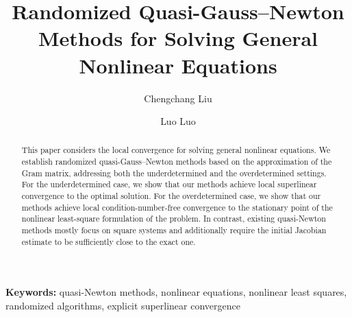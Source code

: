 \documentclass[11pt]{article}
\theoremstyle{plain}
\theoremstyle{definition}
\theoremstyle{remark}
\theoremstyle{plain}
\newenvironment{keywords}
  {\par\medskip\noindent\small\textbf{Keywords:} }
  {\par\medskip}
\begin{document}
\title{Randomized Quasi-Gauss--Newton Methods for Solving General Nonlinear Equations}
\author{Chengchang Liu \and Luo Luo}
\date{}
\maketitle
\begin{abstract}
This paper considers the local convergence for solving general nonlinear equations. 
We establish randomized quasi-Gauss--Newton methods based on the approximation of the Gram matrix, addressing both the underdetermined and the overdetermined settings.
For the underdetermined case, we show that our methods achieve local superlinear convergence to the optimal solution.
For the overdetermined case, we show that our methods achieve local condition-number-free convergence to the stationary point of the nonlinear least-square formulation of the problem.
In contrast, existing quasi-Newton methods mostly focus on square systems and additionally require the initial Jacobian estimate to be sufficiently close to the exact one.
\end{abstract}

\begin{keywords}
quasi-Newton methods, nonlinear equations, nonlinear least squares, randomized algorithms, explicit superlinear convergence
\end{keywords}

\end{document}
